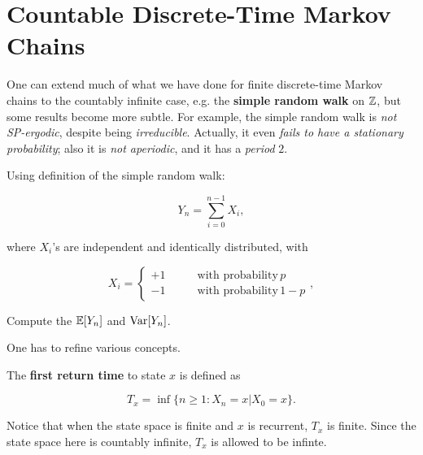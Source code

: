 \section{Countable Discrete-Time Markov Chains}

One can extend much of what we have done for finite discrete-time Markov chains to the countably infinite case, e.g. the \textbf{simple random walk} on $\mathbb{Z}$, but some results become more subtle. For example, the simple random walk is \textit{not SP-ergodic}, despite being \textit{irreducible}. Actually, it even \textit{fails to have a stationary probability}; also it is \textit{not aperiodic}, and it has a \textit{period} $2$.

\begin{example}
    Using definition of the simple random walk:

    \begin{equation*}
        Y_n = \sum_{i=0}^{n-1} X_i,
    \end{equation*}

    where $X_i$'s are independent and identically distributed, with 

    \begin{equation*}
        X_i = 
        \begin{cases}
            +1 \qquad & \text{with probability} \, p \\
            -1 \qquad & \text{with probability} \, 1-p
        \end{cases},
    \end{equation*}

    Compute the $\mathbb{E}[Y_n]$ and $\mathrm{Var}[Y_n]$.
\end{example}

One has to refine various concepts. 

\begin{definition}
    The \textbf{first return time} to state $x$ is defined as 
    
    \begin{equation*}
        T_x = \inf\{n \ge 1: X_n = x | X_0 = x\}.
    \end{equation*}
\end{definition}

\begin{remark}
    Notice that when the state space is finite and $x$ is recurrent, $T_x$ is finite. Since the state space here is countably infinite, $T_x$ is allowed to be infinte.
\end{remark}

